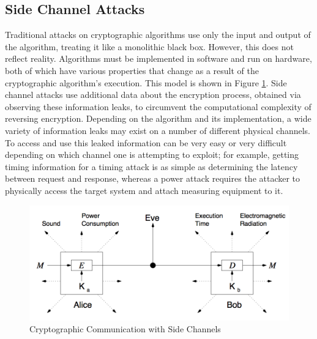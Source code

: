 \documentclass[times, 10pt,twocolumn]{article}
\begin{document}
\subsection{Side Channel Attacks}
Traditional attacks on cryptographic algorithms use only the input and output of the algorithm, treating it like a monolithic black box.  However, this does not reflect reality.  Algorithms must be implemented in software and run on hardware, both of which have various properties that change as a result of the cryptographic algorithm's execution.  This model is shown in Figure \ref{fig:side_model}.  Side channel attacks use additional data about the encryption process, obtained via observing these information leaks, to circumvent the computational complexity of reversing encryption.  Depending on the algorithm and its implementation, a wide variety of information leaks may exist on a number of different physical channels.  To access and use this leaked information can be very easy or very difficult depending on which channel one is attempting to exploit; for example, getting timing information for a timing attack is as simple as determining the latency between request and response, whereas a power attack requires the attacker to physically access the target system and attach measuring equipment to it.
\begin{figure}[ht]
  \centering
  \includegraphics[scale=.25]{./images/side_channel_model.png}
  \caption{Cryptographic Communication with Side Channels}
  \label{fig:side_model}
\end{figure}
\end{document}
